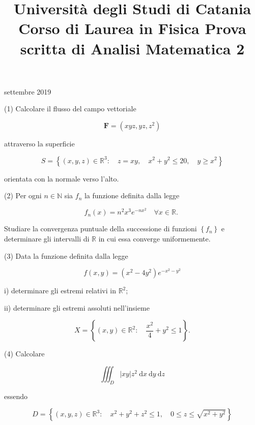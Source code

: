 \documentclass[10pt]{article}
\title{Università degli Studi di Catania 
 Corso di Laurea in Fisica 
 Prova scritta di Analisi Matematica 2 }
\author{}
\date{}
\begin{document}
 settembre 2019

(1) Calcolare il flusso del campo vettoriale

\[
\mathbf{F}=\left(x y z, y z, z^{2}\right)
\]

attraverso la superficie

\[
S=\left\{(x, y, z) \in \mathbb{R}^{3}: \quad z=x y, \quad x^{2}+y^{2} \leq 20, \quad y \geq x^{2}\right\}
\]

orientata con la normale verso l'alto.

(2) Per ogni \(n \in \mathbb{N}\) sia \(f_{n}\) la funzione definita dalla legge

\[
f_{n}(x)=n^{2} x^{3} e^{-n x^{2}} \quad \forall x \in \mathbb{R} \text {. }
\]

Studiare la convergenza puntuale della successione di funzioni \(\left\{f_{n}\right\}\) e determinare gli intervalli di \(\mathbb{R}\) in cui essa converge uniformemente.

(3) Data la funzione definita dalla legge

\[
f(x, y)=\left(x^{2}-4 y^{2}\right) e^{-x^{2}-y^{2}}
\]

i) determinare gli estremi relativi in \(\mathbb{R}^{2}\);

ii) determinare gli estremi assoluti nell'insieme

\[
X=\left\{(x, y) \in \mathbb{R}^{2}: \quad \frac{x^{2}}{4}+y^{2} \leq 1\right\} .
\]

(4) Calcolare

\[
\iiint_{D}|x y| z^{2} \mathrm{~d} x \mathrm{~d} y \mathrm{~d} z
\]

essendo

\[
D=\left\{(x, y, z) \in \mathbb{R}^{3}: \quad x^{2}+y^{2}+z^{2} \leq 1, \quad 0 \leq z \leq \sqrt{x^{2}+y^{2}}\right\}
\]
\end{document}
